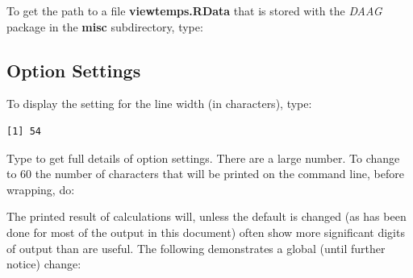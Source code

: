 To get the path to a file {\bf viewtemps.RData} that is stored with
the {\em DAAG} package in the {\bf misc} subdirectory, type:
\begin{fullwidth}
\begin{knitrout}
\color{fgcolor}\begin{kframe}
\begin{alltt}
\hlstd{(}\hlstd{,} \hlstd{=}\hlstd{)}
\end{alltt}
\end{kframe}
\end{knitrout}
\end{fullwidth}

\subsection{Option Settings}

\begin{marginfigure}[44pt]
To display the setting for the
line width (in characters), type:
\begin{knitrout}
\color{fgcolor}\begin{kframe}
\begin{alltt}
\hlstd{()}\hlopt{$}
\end{alltt}
\begin{verbatim}
[1] 54
\end{verbatim}
\end{kframe}
\end{knitrout}
\end{marginfigure}
Type  to get full details of option settings.
There are a large number.  To change to 60 the number of characters
that will be printed on the command line, before wrapping, do:
\begin{knitrout}
\color{fgcolor}\begin{kframe}
\begin{alltt}
\hlstd{(}\hlstd{=}\hlstd{)}
\end{alltt}
\end{kframe}
\end{knitrout}

The printed result of calculations will, unless the default is changed
(as has been done for most of the output in this document) often
show more significant digits of output than are useful.  The following
demonstrates a global (until further notice) change:

